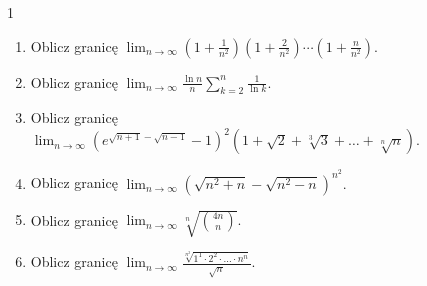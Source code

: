 \documentclass{../note}
\begin{document}
\begin{zadanie}{1}
\begin{enumerate}[label=(\alph*)] %
        \item Oblicz granicę $\lim_{n\rightarrow\infty} \left(1+\frac{1}{n^{2}}\right) \left(1+\frac{2}{n^{2}}\right) \cdots \left(1+\frac{n}{n^{2}}\right).$
        
        \item Oblicz granicę $\lim_{n\rightarrow\infty} \frac{\ln n}{n} \sum_{k=2}^{n} \frac{1}{\ln k}.$
        
        \item Oblicz granicę $\lim_{n\rightarrow\infty} \left(e^{\sqrt{n+1}-\sqrt{n-1}}-1\right)^{2} \left(1+\sqrt{2}+\sqrt[3]{3}+\dots+\sqrt[n]{n}\right).$
        
        \item Oblicz granicę $\lim_{n\rightarrow\infty} \left(\sqrt{n^{2}+n}-\sqrt{n^{2}-n}\right)^{n^{2}}.$
        
        \item Oblicz granicę $\lim_{n\rightarrow\infty} \sqrt[n]{\binom{4n}{n}}.$
        
        \item Oblicz granicę $\lim_{n\rightarrow\infty} \frac{\sqrt[n^{2}]{1^{1}\cdot 2^{2}\cdot\ldots\cdot n^{n}}}{\sqrt{n}}.$
    \end{enumerate}
\end{zadanie}
\end{document}
